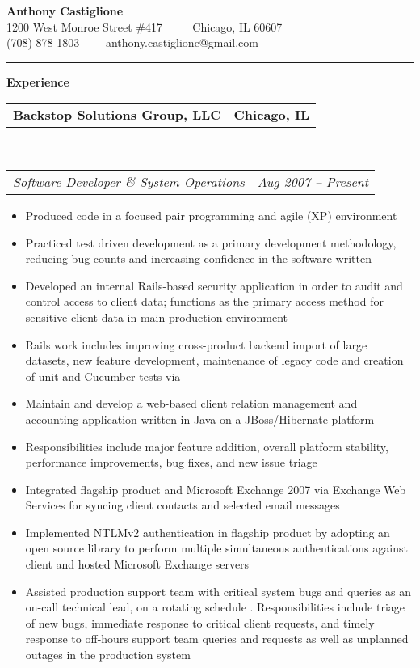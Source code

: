 \documentclass[10pt,letterpaper]{article}
\makeatletter
\newcommand{\headerrow}[2]
{\begin{tabular*}{\linewidth}{l@{\extracolsep{\fill}}r}
	#1 &
	#2 \\
\end{tabular*}}
\newenvironment{indentsection}[1]%
{\begin{list}{}%
	{\setlength{\leftmargin}{#1}}%
	\item[]%
}
{\end{list}}
\makeatother
\begin{document}
\begin{center}
{\LARGE \textbf {Anthony Castiglione}} \\  1200 West Monroe Street \#417 \ \ \textbullet
       \ \ Chicago, IL 60607 \\ (708) 878-1803 \ \ \textbullet \ \ anthony.castiglione@gmail.com
	\end{center}
\hrule
\vspace{0.2in}
{\large \textbf{Experience}}


\begin{indentsection}{\parindent}
	\headerrow
		{\textbf{Backstop Solutions Group, LLC} }
		{\textbf{Chicago, IL}}
	\\
	\headerrow
		{\emph{Software Developer \& System Operations}}
		{\emph{Aug 2007 -- Present}}

	\begin{itemize}
	\renewcommand{\labelitemi}{$-$}
	\vspace{-0.1in}
    \item Produced code in a focused pair programming and agile (XP)
environment
    \item Practiced test driven development as a primary development
methodology, reducing bug counts and increasing confidence in the software
written
		\item Developed an internal Rails-based security application in order to audit and control access to client data; functions as the primary access method for sensitive client data in main production environment
    \item Rails work includes improving cross-product backend import of large
datasets, new feature development, maintenance of legacy code and creation of
unit and Cucumber tests via
		\item Maintain and develop a web-based client relation management and accounting application written in Java on a JBoss/Hibernate platform
		\item Responsibilities include major feature addition, overall platform stability, performance improvements, bug fixes, and new issue triage
		\item Integrated flagship product and Microsoft Exchange 2007 via Exchange Web Services for syncing client contacts and selected email messages
		\item Implemented NTLMv2 authentication in flagship product by adopting an open source library to perform multiple simultaneous authentications against client and hosted Microsoft Exchange servers
		\item Assisted production support team with critical system bugs and queries as an on-call technical lead, on a rotating schedule . Responsibilities include triage of new bugs, immediate response to critical client requests, and timely response to off-hours support team queries and requests as well as unplanned outages in the production system
	\end{itemize}
\end{indentsection}
\end{document}
